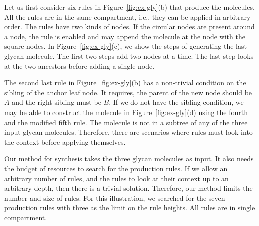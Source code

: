 Let us first consider six rules in Figure~\ref{fig:ex-gly}(b)
that produce the molecules.
All the rules are in the same compartment, i.e., they can be applied in arbitrary order.
The rules have two kinds of nodes.
If the circular nodes are present around a node,
the rule is enabled and may append the molecule at the
node with the square nodes.
In Figure~\ref{fig:ex-gly}(c), we show the steps of generating the last
glycan molecule.
The first two steps add two nodes at a time.
The last step looks at the two ancestors before adding a single node.

The second last rule in Figure~\ref{fig:ex-gly}(b) has a non-trivial condition
on the sibling of the anchor leaf node.
It requires, the parent of the new node should be $A$ and the right sibling
must be $B$.
If we do not have the sibling condition, we may be able to construct the molecule
in Figure~\ref{fig:ex-gly}(d) using the fourth and the modified fifth rule.
The molecule is not in a subtree of any of the three input glycan molecules.
Therefore, there are scenarios where rules must look into the context before applying
themselves.



Our method for synthesis takes the three glycan molecules as input.
It also needs the budget of resources to search for the production rules.
If we allow an arbitrary number of rules,
and the rules to look at their context up to
an arbitrary depth, %
then there is a trivial solution.
Therefore, our method limits the number and size of rules.
For this illustration, we searched for the seven production rules with
three as the limit on the rule heights.
All rules are in single compartment.

